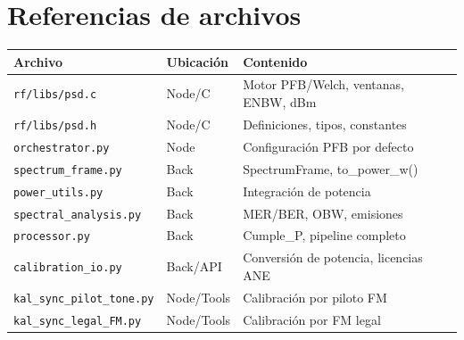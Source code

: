 \documentclass[11pt,a4paper]{article}
\begin{document}
\section*{Referencias de archivos}

\begin{center}
\small
\begin{tabular}{lll}
\toprule
\textbf{Archivo} & \textbf{Ubicación} & \textbf{Contenido} \\
\midrule
\texttt{rf/libs/psd.c} & Node/C & Motor PFB/Welch, ventanas, ENBW, dBm \\
\texttt{rf/libs/psd.h} & Node/C & Definiciones, tipos, constantes \\
\texttt{orchestrator.py} & Node & Configuración PFB por defecto \\
\texttt{spectrum\_frame.py} & Back & SpectrumFrame, to\_power\_w() \\
\texttt{power\_utils.py} & Back & Integración de potencia \\
\texttt{spectral\_analysis.py} & Back & MER/BER, OBW, emisiones \\
\texttt{processor.py} & Back & Cumple\_P, pipeline completo \\
\texttt{calibration\_io.py} & Back/API & Conversión de potencia, licencias ANE \\
\texttt{kal\_sync\_pilot\_tone.py} & Node/Tools & Calibración por piloto FM \\
\texttt{kal\_sync\_legal\_FM.py} & Node/Tools & Calibración por FM legal \\
\bottomrule
\end{tabular}
\end{center}
\end{document}

